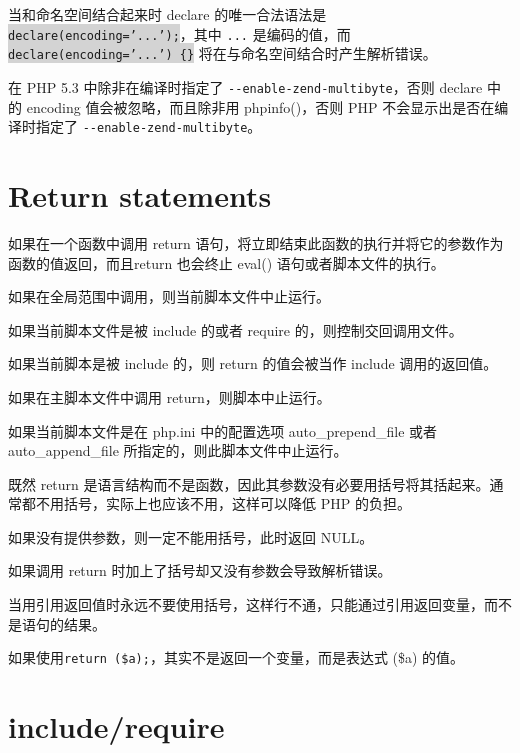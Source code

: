当和命名空间结合起来时 declare 的唯一合法语法是 \colorbox{lightgray}{\texttt{declare(encoding='...');}}，其中 \texttt{...} 是编码的值，而 \colorbox{lightgray}{\texttt{declare(encoding='...') \{\}}} 将在与命名空间结合时产生解析错误。

在 PHP 5.3 中除非在编译时指定了 \texttt{-\/-enable-zend-multibyte}，否则 declare 中的 encoding 值会被忽略，而且除非用 phpinfo()，否则 PHP 不会显示出是否在编译时指定了 \texttt{-\/-enable-zend-multibyte}。

\section{Return statements}

如果在一个函数中调用 return 语句，将立即结束此函数的执行并将它的参数作为函数的值返回，而且return 也会终止 eval() 语句或者脚本文件的执行。


\begin{compactitem}
\item 如果在全局范围中调用，则当前脚本文件中止运行。
\item 如果当前脚本文件是被 include 的或者 require 的，则控制交回调用文件。
\item 如果当前脚本是被 include 的，则 return 的值会被当作 include 调用的返回值。
\item 如果在主脚本文件中调用 return，则脚本中止运行。
\item 如果当前脚本文件是在 php.ini 中的配置选项 auto\_prepend\_file 或者 auto\_append\_file 所指定的，则此脚本文件中止运行。
\end{compactitem}


既然 return 是语言结构而不是函数，因此其参数没有必要用括号将其括起来。通常都不用括号，实际上也应该不用，这样可以降低 PHP 的负担。


\begin{compactitem}
\item 如果没有提供参数，则一定不能用括号，此时返回 NULL。
\item 如果调用 return 时加上了括号却又没有参数会导致解析错误。
\end{compactitem}


当用引用返回值时永远不要使用括号，这样行不通，只能通过引用返回变量，而不是语句的结果。

如果使用\texttt{return (\$a);}，其实不是返回一个变量，而是表达式 (\$a) 的值。



\section{include/require}

